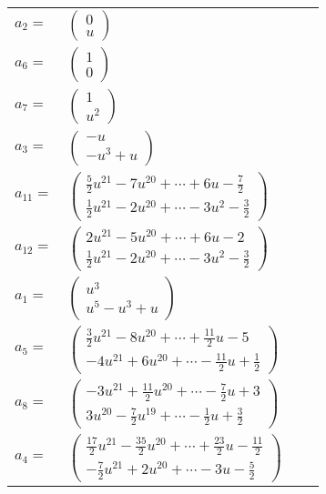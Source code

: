 \documentclass[1p]{elsarticle_modified}
\theoremstyle{definition}
\begin{document}
\begin{tabular}{m{7pt} m{180pt} m{7pt} m{180pt} }
\flushright $a_{2}=$&$\begin{pmatrix}0\\u\end{pmatrix}$ \\
\flushright $a_{6}=$&$\begin{pmatrix}1\\0\end{pmatrix}$ \\
\flushright $a_{7}=$&$\begin{pmatrix}1\\u^2\end{pmatrix}$ \\
\flushright $a_{3}=$&$\begin{pmatrix}- u\\- u^3+u\end{pmatrix}$ \\
\flushright $a_{11}=$&$\begin{pmatrix}\frac{5}{2} u^{21}-7 u^{20}+\cdots+6 u-\frac{7}{2}\\\frac{1}{2} u^{21}-2 u^{20}+\cdots-3 u^2-\frac{3}{2}\end{pmatrix}$ \\
\flushright $a_{12}=$&$\begin{pmatrix}2 u^{21}-5 u^{20}+\cdots+6 u-2\\\frac{1}{2} u^{21}-2 u^{20}+\cdots-3 u^2-\frac{3}{2}\end{pmatrix}$ \\
\flushright $a_{1}=$&$\begin{pmatrix}u^3\\u^5- u^3+u\end{pmatrix}$ \\
\flushright $a_{5}=$&$\begin{pmatrix}\frac{3}{2} u^{21}-8 u^{20}+\cdots+\frac{11}{2} u-5\\-4 u^{21}+6 u^{20}+\cdots-\frac{11}{2} u+\frac{1}{2}\end{pmatrix}$ \\
\flushright $a_{8}=$&$\begin{pmatrix}-3 u^{21}+\frac{11}{2} u^{20}+\cdots-\frac{7}{2} u+3\\3 u^{20}-\frac{7}{2} u^{19}+\cdots-\frac{1}{2} u+\frac{3}{2}\end{pmatrix}$ \\
\flushright $a_{4}=$&$\begin{pmatrix}\frac{17}{2} u^{21}-\frac{35}{2} u^{20}+\cdots+\frac{23}{2} u-\frac{11}{2}\\-\frac{7}{2} u^{21}+2 u^{20}+\cdots-3 u-\frac{5}{2}\end{pmatrix}$ \\

\end{tabular}
\end{document}
